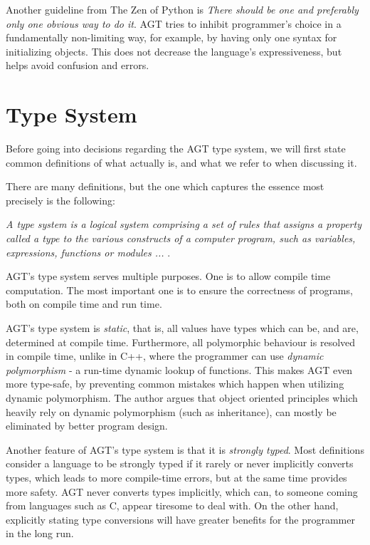 \documentclass[times, utf8, diplomski]{fer}
\theoremstyle{definition}
\begin{document}
Another guideline from The Zen of Python is 
\textit{There should be one and preferably only one obvious way to do it}. 
AGT tries to inhibit programmer's choice in a fundamentally non-limiting way, for example, by
having only one syntax for initializing objects. This does not decrease the 
language's expressiveness, but helps avoid confusion and errors.

\section{Type System}

Before going into decisions regarding the AGT type system, we will first state common
definitions of what  actually is, and what we refer to when discussing it.

There are many definitions, but the one which captures the essence most precisely is the following:

\textit{A type system is a logical system comprising a set of rules that 
    assigns a property called a type to the various constructs of a computer program, 
such as variables, expressions, functions or modules ... }\citep{c_type_system}.

AGT's type system serves multiple purposes. One is to allow compile time computation.
The most important one is to ensure the correctness of programs, both on compile time and run time.

AGT's type system is \textit{static}, that is, all values have types which can be, and are, determined
at compile time. Furthermore, all polymorphic behaviour is resolved in compile time, unlike in C++,
where the programmer can use \textit{dynamic polymorphism} - a run-time dynamic lookup of functions.
This makes AGT even more type-safe, by preventing common mistakes which happen when utilizing
dynamic polymorphism. The author argues that object oriented principles which heavily rely on
dynamic polymorphism (such as inheritance), can mostly be eliminated by better program design.

Another feature of AGT's type system is that it is \textit{strongly typed}. Most definitions consider
a language to be strongly typed if it rarely or never implicitly converts
types, which leads to more compile-time errors, but at the same time provides
more safety. AGT never converts types implicitly,
which can, to someone coming from languages such as C, appear tiresome to deal with. On the other hand,
explicitly stating type conversions will have greater benefits for the
programmer in the long run.
\end{document}
